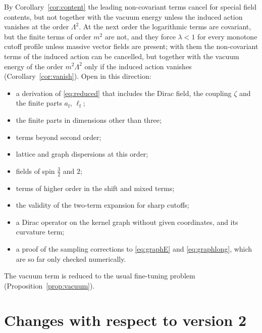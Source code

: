 \documentclass[11pt,a4paper]{article}
\theoremstyle{stmt}
\theoremstyle{defn}
\theoremstyle{rmk}
\numberwithin{equation}{section}
\begin{document}
\begin{enumerate}
By Corollary~\ref{cor:content} the leading non-covariant terms cancel for special field contents, but not together with the vacuum energy unless the induced action vanishes at the order $\Lambda^2$. At the next order the logarithmic terms are covariant, but the finite terms of order $m^2$ are not, and they force $\lambda<1$ for every monotone cutoff profile unless massive vector fields are present; with them the non-covariant terms of the induced action can be cancelled, but together with the vacuum energy of the order $m^2\Lambda^2$ only if the induced action vanishes (Corollary~\ref{cor:vanish}). Open in this direction:
\begin{itemize}
\item a derivation of \eqref{eq:reduced} that includes the Dirac field, the coupling $\zeta$ and the finite parts $a_{\mathrm f}$, $\ell_{\mathrm f}$;
\item the finite parts in dimensions other than three;
\item terms beyond second order;
\item lattice and graph dispersions at this order;
\item fields of spin $\tfrac32$ and $2$;
\item terms of higher order in the shift and mixed terms;
\item the validity of the two-term expansion for sharp cutoffs;
\item a Dirac operator on the kernel graph without given coordinates, and its curvature term;
\item a proof of the sampling corrections to \eqref{eq:graphE} and \eqref{eq:graphlong}, which are so far only checked numerically.
\end{itemize}
The vacuum term is reduced to the usual fine-tuning problem (Proposition~\ref{prop:vacuum}).
\end{enumerate}

\section{Changes with respect to version 2}\label{sec:changes}
\end{document}
